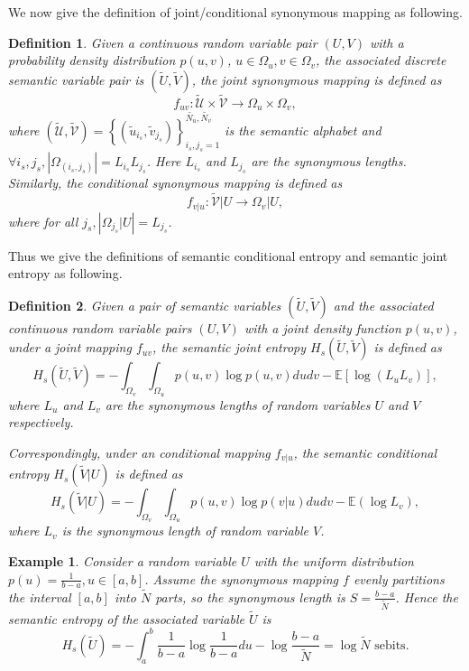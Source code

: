\documentclass[12pt, draftclsnofoot,onecolumn]{IEEEtran}
\newtheorem{definition}{\bf{Definition}}
\newtheorem{example}{\bf{Example}}
\begin{document}
We now give the definition of joint/conditional synonymous mapping as following.
\begin{definition}
Given a continuous random variable pair $(U,V)$ with a probability density distribution $p(u,v)$, $u\in \Omega_u, v\in \Omega_v$, the associated discrete semantic variable pair is $(\tilde{U},\tilde{V})$, the joint synonymous mapping is defined as
\begin{equation}
f_{uv}: \tilde{\mathcal{U}}\times \tilde{\mathcal{V}} \to \Omega_u \times \Omega_v,
\end{equation}
where $(\tilde{\mathcal{U}},\tilde{\mathcal{V}})=\left\{(\tilde{u}_{i_s},\tilde{v}_{j_s})\right\}_{i_s,j_s=1}^{\tilde{N_u},\tilde{N_v}}$ is the semantic alphabet and $\forall i_s,j_s, \left|\Omega_{(i_s,j_s)}\right|=L_{i_s}L_{j_s}$.
Here $L_{i_s}$ and $L_{j_s}$ are the synonymous lengths.
Similarly, the conditional synonymous mapping is defined as
\begin{equation}
f_{v|u}: \tilde{\mathcal{V}}|U  \to   \Omega_v|U,
\end{equation}
where for all $ j_s, \left|\Omega_{j_s}|U\right|=L_{j_s}$.
\end{definition}

Thus we give the definitions of semantic conditional entropy and semantic joint entropy as following.
\begin{definition}
Given a pair of semantic variables $(\tilde {U},\tilde {V})$ and the associated continuous random variable pairs $\left(U,V\right)$ with a joint density function $p(u,v)$, under a joint mapping $f_{uv}$, the semantic joint entropy $H_s(\tilde {U},\tilde {V})$ is defined as
\begin{equation}
H_s(\tilde{U},\tilde{V})=-\int_{\Omega_v}\int_{\Omega_u} p(u,v)\log p(u,v)dudv-\mathbb{E}\left[\log (L_u L_v)\right],
\end{equation}
where $L_u$ and $L_v$ are the synonymous lengths of random variables $U$ and $V$ respectively.

Correspondingly, under an conditional mapping $f_{v|u}$, the semantic conditional entropy $H_s(\tilde {V}|U)$ is defined as
\begin{equation}
H_s(\tilde{V}|U)=-\int_{\Omega_v}\int_{\Omega_u} p(u,v)\log p(v|u)dudv-\mathbb{E}(\log L_v),
\end{equation}
where $L_v$ is the synonymous length of random variable $V$.
\end{definition}

\begin{example}
Consider a random variable $U$ with the uniform distribution $p(u)=\frac{1}{b-a},u\in[a,b]$. Assume the synonymous mapping $f$ evenly partitions the interval $[a,b]$ into $\tilde{N}$ parts, so the synonymous length is $S=\frac{b-a}{\tilde{N}}$. Hence the semantic entropy of the associated variable $\tilde{U}$ is
\begin{equation}
H_s(\tilde{U})=-\int_{a}^{b}\frac{1}{b-a}\log\frac{1}{b-a}du-\log \frac{b-a}{\tilde{N}}= \log{\tilde{N}} \text{ sebits}.
\end{equation}

\end{example}
\end{document}
